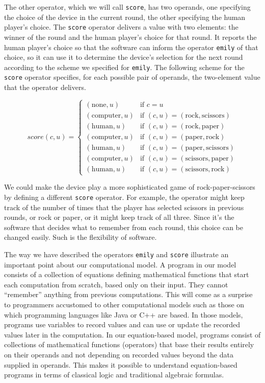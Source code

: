 The other operator, which we will call \texttt{score},
has two operands, one specifying the choice of the device in the current round,
the other specifying the human player's choice.
The \texttt{score} operator delivers a value with two elements:
the winner of the round and the human player's choice for that round.
It reports the human player's choice so that the software
can inform  the operator \texttt{emily} of that choice,
so it can use it to determine the device's selection for the next round
according to the scheme we specified for \texttt{emily}.
The following scheme for the \texttt{score} operator specifies,
for each possible pair of operands,
the two-element value that the operator delivers.

\begin{displaymath}
score(c,u) =
   \left\{
        \begin{array}{ll}
        (\mbox{none}, u)     & \mbox{if } c = u \\
        (\mbox{computer}, u) & \mbox{if } (c,u) = (\mbox{rock}, \mbox{scissors}) \\
        (\mbox{human}, u)    & \mbox{if } (c,u) = (\mbox{rock}, \mbox{paper}) \\
        (\mbox{computer}, u) & \mbox{if } (c,u) = (\mbox{paper}, \mbox{rock}) \\
        (\mbox{human}, u)    & \mbox{if } (c,u) = (\mbox{paper}, \mbox{scissors}) \\
        (\mbox{computer}, u) & \mbox{if } (c,u) = (\mbox{scissors}, \mbox{paper}) \\
        (\mbox{human}, u)    & \mbox{if } (c,u) = (\mbox{scissors}, \mbox{rock})
        \end{array}
   \right.
\end{displaymath}

We could make the device play a more sophisticated game of
rock-paper-scissors by defining a different \texttt{score} operator.
For example, the operator might
keep track of the number of times that the player has selected scissors
in previous rounds, or rock or paper, or it might keep track of all three.
Since it's the software that decides what to remember
from each round, this choice can be changed easily.
Such is the flexibility of software.

The way we have described the operators \texttt{emily} and \texttt{score}
illustrate an important point about our computational model.
A program in our model consists of a collection of equations
defining mathematical functions that start each computation from scratch,
based only on their input. They cannot ``remember'' anything from previous computations.
This will come as a surprise to programmers accustomed
to other computational models such as those on which
programming languages like Java or C++ are based.
In those models, programs use variables to record values
and can use or update the recorded values later in the computation.
In our equation-based model,
programs consist of collections of mathematical functions (operators)
that base their results entirely on their operands
and not depending on recorded values beyond the data supplied in operands.
This makes it possible to
understand equation-based programs in terms of classical
logic and traditional algebraic formulas.

